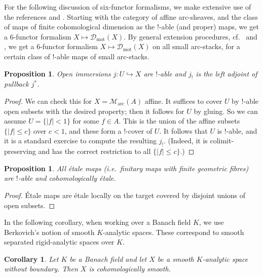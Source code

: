 \documentclass[11pt]{amsart}
\numberwithin{equation}{section}
\numberwithin{theorem}{section}
\newtheorem{corollary}[theorem]{Corollary}
\newtheorem{proposition}[theorem]{Proposition}
\theoremstyle{definition}
\begin{document}
For the following discussion of six-functor formalisms, we make extensive use of the references \cite{ScholzeSixFunctors} and \cite{HeyerMann}. Starting with the category of affine arc-sheaves, and the class of maps of finite cohomological dimension as the $!$-able (and proper) maps, we get a $6$-functor formalism $X\mapsto \mathcal D_{\mathrm{mot}}(X)$. By general extension procedures, cf.~\cite[Theorem 5.19]{ScholzeSixFunctors} and \cite[Theorem 3.4.11]{HeyerMann}, we get a $6$-functor formalism $X\mapsto \mathcal D_{\mathrm{mot}}(X)$ on all small arc-stacks, for a certain class of $!$-able maps of small arc-stacks.

\begin{proposition} Open immersions $j: U\hookrightarrow X$ are $!$-able and $j_!$ is the left adjoint of pullback $j^\ast$.
\end{proposition}

\begin{proof} We can check this for $X=\mathcal M_{\mathrm{arc}}(A)$ affine. It suffices to cover $U$ by $!$-able open subsets with the desired property; then it follows for $U$ by gluing. So we can assume $U=\{|f|<1\}$ for some $f\in A$. This is the union of the affine subsets $\{|f|\leq c\}$ over $c<1$, and these form a $!$-cover of $U$. It follows that $U$ is $!$-able, and it is a standard exercise to compute the resulting $j_!$. (Indeed, it is colimit-preserving and has the correct restriction to all $\{|f|\leq c\}$.)
\end{proof}

\begin{proposition} All \'etale maps (i.e.~finitary maps with finite geometric fibres) are $!$-able and cohomologically \'etale.
\end{proposition}

\begin{proof} \'Etale maps are \'etale locally on the target covered by disjoint unions of open subsets.
\end{proof}

In the following corollary, when working over a Banach field $K$, we use Berkovich's notion of smooth $K$-analytic spaces. These correspond to smooth separated rigid-analytic spaces over $K$.

\begin{corollary}\label{cor:smoothcohomsmooth} Let $K$ be a Banach field and let $X$ be a smooth $K$-analytic space without boundary. Then $X$ is cohomologically smooth.
\end{corollary}
\end{document}
